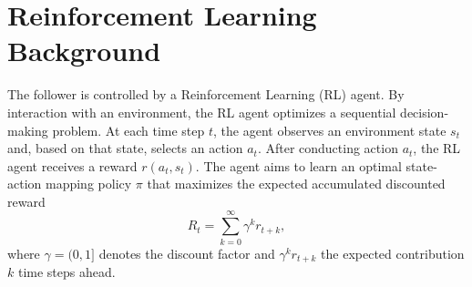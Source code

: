 \documentclass[review]{elsarticle}
\providecommand{\martin}[1]{#1}                  %
\providecommand{\3}{{\ss}}
\begin{document}
\section{Reinforcement Learning Background}
\label{sec:RLBackground}

The \martin{follower} is controlled by a Reinforcement
Learning (RL) agent. By interaction with an environment, the RL agent
optimizes a sequential decision-making problem. At each time step
$t$, the agent observes an environment state $s_t$ and, based on that state, selects
an action $a_t$. After conducting action $a_t$, the RL agent receives
a reward $r(a_t,s_t)$. The agent aims to learn an optimal state-action
mapping policy $\pi$ that maximizes the expected accumulated
discounted reward
\begin{equation}
\label{Rt}
R_{t}=\sum_{k=0}^{\infty} \gamma^{k} r_{t+k},
\end{equation}
 where $\gamma = (0,1]$ denotes the discount factor and 
$\gamma^k r_{t+k}$ the expected contribution $k$ time steps ahead. 
\end{document}
